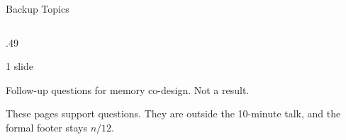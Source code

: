 \begin{frame}[t,label=backup_index]{Backup Topics}
\begin{columns}[T,onlytextwidth]
\begin{column}{.49\textwidth}
      \vspace{.07cm}
      {\footnotesize{}\hfill{\scriptsize\color{Muted}1 slide}\par}
      {\scriptsize\color{Muted}Follow-up questions for memory co-design. Not a result.}\par
      \vspace{.22cm}
      {\footnotesize{}\par}
      \vspace{.08cm}
      {\scriptsize\color{Muted}These pages support questions. They are outside the 10-minute talk, and the formal footer stays \(n/12\).}
    \end{column}
  \end{columns}
\end{frame}
